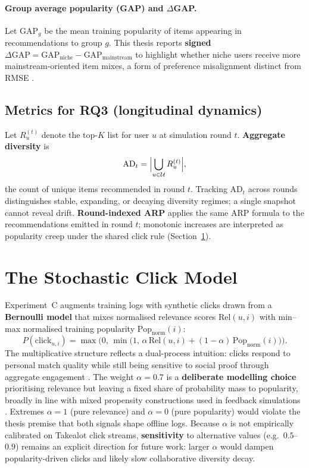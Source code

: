 \paragraph{Group average popularity (GAP) and $\Delta$GAP.}
Let $\text{GAP}_g$ be the mean training popularity of items appearing in recommendations to group $g$. This thesis reports \textbf{signed} $\Delta\text{GAP} = \text{GAP}_{\text{niche}} - \text{GAP}_{\text{mainstream}}$ to highlight whether niche users receive more mainstream-oriented item mixes, a form of preference misalignment distinct from RMSE \citep{abdollahpouri2020multistakeholder}.

\subsection{Metrics for RQ3 (longitudinal dynamics)}
\label{sec:method_metrics_rq3}

Let $R_u^{(t)}$ denote the top-$K$ list for user $u$ at simulation round $t$. \textbf{Aggregate diversity} is
\begin{equation}
  \text{AD}_t = \Bigl|\bigcup_{u\in\mathcal{U}} R_u^{(t)}\Bigr|,
\end{equation}
the count of unique items recommended in round $t$. Tracking $\text{AD}_t$ across rounds distinguishes stable, expanding, or decaying diversity regimes; a single snapshot cannot reveal drift. \textbf{Round-indexed ARP} applies the same ARP formula to the recommendations emitted in round $t$; monotonic increases are interpreted as popularity creep under the shared click rule (Section~\ref{sec:method_click}).

\section{The Stochastic Click Model}
\label{sec:method_click}

Experiment~C augments training logs with synthetic clicks drawn from a \textbf{Bernoulli model} that mixes normalised relevance scores $\text{Rel}(u,i)$ with min--max normalised training popularity $\text{Pop}_{\text{norm}}(i)$:
\begin{equation}
  P(\text{click}_{u,i}) = \max\bigl(0,\, \min\bigl(1,\, \alpha\,\text{Rel}(u,i) + (1-\alpha)\,\text{Pop}_{\text{norm}}(i)\bigr)\bigr).
\end{equation}
The multiplicative structure reflects a dual-process intuition: clicks respond to personal match quality while still being sensitive to social proof through aggregate engagement \citep{cialdini1984influence, zhao2022benignharmful}. The weight $\alpha=0.7$ is a \textbf{deliberate modelling choice} prioritising relevance but leaving a fixed share of probability mass to popularity, broadly in line with mixed propensity constructions used in feedback simulations \citep{mansoury2020feedback}. Extremes $\alpha=1$ (pure relevance) and $\alpha=0$ (pure popularity) would violate the thesis premise that both signals shape offline logs. Because $\alpha$ is not empirically calibrated on Takealot click streams, \textbf{sensitivity} to alternative values (e.g.\ $0.5$--$0.9$) remains an explicit direction for future work: larger $\alpha$ would dampen popularity-driven clicks and likely slow collaborative diversity decay.

